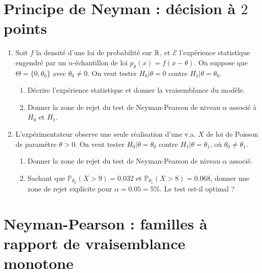 \section{Principe de Neyman : décision à $2$ points}

\begin{enumerate}

\item Soit $f$ la densité d'une loi de probabilité sur $\mathbb R$, et $\mathcal E$ l'expérience statistique engendré par un $n$-échantillon de loi $p_\theta(x)=f(x-\theta)$. On suppose que $\Theta =\{0, \theta_0\}$ avec $\theta_0\neq 0$. On veut tester $H_0| \theta = 0$ contre $H_1| \theta= \theta_0$.
\begin{enumerate}
\item Décrire l'expérience statistique et donner la vraisemblance du modèle.
\item Donner la zone de rejet du test de Neyman-Pearson de niveau $\alpha$ associé à $H_0$ et $H_1$.
\end{enumerate}

\item L'expérimentateur observe une seule réalisation d'une v.a. $X$ de loi de Poisson de paramètre $\theta>0$. On veut tester $H_0| \theta = \theta_0$ contre $H_1| \theta= \theta_1$, où $\theta_0\neq \theta_1$.
\begin{enumerate}
\item Donner la zone de rejet du test de Neyman-Pearson de niveau $\alpha$ associé.
\item Sachant que $\mathbb P_{\theta_0}(X>9)=0.032$ et $\mathbb P_{\theta_1}(X>8)=0.068$, donner une zone de rejet explicite pour $\alpha = 0.05 = 5\%$. Le test est-il optimal ?
\end{enumerate}

\end{enumerate}

\section{Neyman-Pearson : familles à rapport de vraisemblance monotone}

